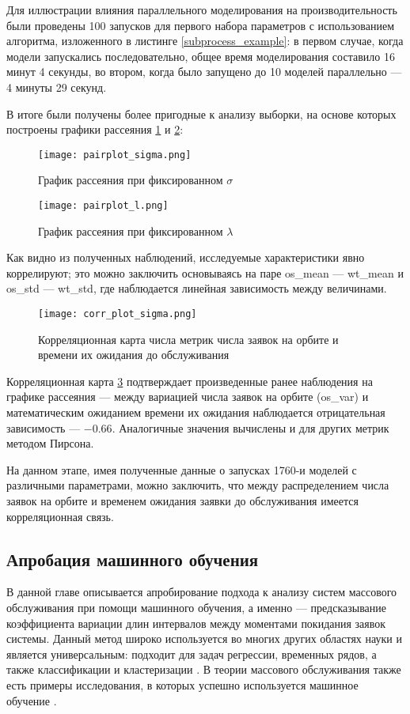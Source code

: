 Для иллюстрации влияния параллельного моделирования на производительность были проведены 100 запусков для первого набора параметров с использованием алгоритма, изложенного в листинге \ref{subprocess_example}: в первом случае, когда модели запускались последовательно, общее время моделирования составило 16 минут 4 секунды, во втором, когда было запущено до 10 моделей параллельно --- 4 минуты 29 секунд. 

В итоге были получены более пригодные к анализу выборки, на основе которых построены графики рассеяния \ref{os_wt_pairplot_sigma} и \ref{os_wt_pairplot_l}:

\begin{figure}[H]
	\centering
	\texttt{[image: pairplot\_sigma.png]}
	\caption{График рассеяния при фиксированном $\sigma$} 
	\label{os_wt_pairplot_sigma}
\end{figure}

\begin{figure}[H]
	\centering
	\texttt{[image: pairplot\_l.png]}
	\caption{График рассеяния при фиксированном $\lambda$} 
	\label{os_wt_pairplot_l}
\end{figure}

Как видно из полученных наблюдений, исследуемые характеристики явно коррелируют; это можно заключить основываясь на паре os\_mean --- wt\_mean и os\_std --- wt\_std, где наблюдается линейная зависимость между величинами.

\begin{figure}[H]
	\centering
	\texttt{[image: corr\_plot\_sigma.png]}
	\caption{Корреляционная карта числа метрик числа заявок на орбите и времени их ожидания до обслуживания} 
	\label{os_wt_corr_map}
\end{figure}

Корреляционная карта \ref{os_wt_corr_map} подтверждает произведенные ранее наблюдения на графике рассеяния --- между вариацией числа заявок на орбите (os\_var) и математическим ожиданием времени их ожидания наблюдается отрицательная зависимость --- $-0.66$. Аналогичные значения вычислены и для других метрик методом Пирсона.

На данном этапе, имея полученные данные о запусках 1760-и моделей с различными параметрами, можно заключить, что между распределением числа заявок на орбите и временем ожидания заявки до обслуживания имеется корреляционная связь.

\subsection{Апробация машинного обучения}
В данной главе описывается апробирование подхода к анализу систем массового обслуживания при помощи машинного обучения, а именно --- предсказывание коэффициента вариации длин интервалов между моментами покидания заявок системы. Данный метод широко используется во многих других областях науки и является универсальным: подходит для задач регрессии, временных рядов, а также классификации и кластеризации \cite{libbrecht2015machine,shinde2018review,soofi2017classification}. В теории массового обслуживания также есть примеры исследования, в которых успешно используется машинное обучение \cite{ojeda2021learning,xue2016scheduling,balla2018reliability}.

